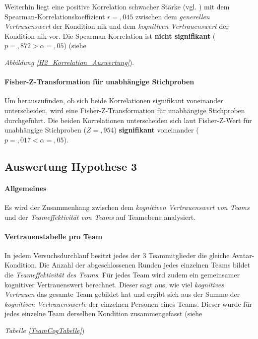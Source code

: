 \documentclass[a4paper,11pt]{article}%
\renewcommand{\\}{\vspace*{0.5\baselineskip} \newline}
\begin{document}
{{{{{{Weiterhin liegt eine positive Korrelation schwacher Stärke (vgl. \citep{cohen2013statistical}) mit dem Spearman-Korrelationskoeffizient $r = ,045$ zwischen dem \textit{generellen Vertrauenswert} der Kondition \newline \ac{nik} und dem \textit{kognitiven Vertrauenswert} der Kondition \ac{nik} vor. Die Spearman-Korrelation ist \textbf{nicht signifikant} ($p = ,872 > \alpha = ,05$) (siehe {\textit{Abbildung \ref{H2_Korrelation_Auswertung}}).

\paragraph{Fisher-Z-Transformation für unabhängige Stichproben}
Um herauszufinden, ob sich beide Korrelationen signifikant voneinander unterscheiden, wird eine Fisher-Z-Transformation für unabhängige Stichproben durchgeführt.
Die beiden Korrelationen unterscheiden sich laut Fisher-Z-Wert für unabhängige Stichproben ($Z =,954$) \textbf{signifikant} voneinander ($p =,017 < \alpha =,05$).

\newpage
\clearpage
\subsection{Auswertung Hypothese 3}
\label{Auswertung Hypothese 3}
\paragraph{Allgemeines}
Es wird der Zusammenhang zwischen dem \textit{kognitiven Vertrauenswert von Teams} und der \textit{Teameffektivität von Teams} auf Teamebene analysiert.

\paragraph{Vertrauenstabelle pro Team}
In jedem Versuchsdurchlauf besitzt jedes der 3 Teammitglieder die gleiche Avatar-Kondition. Die Anzahl der abgeschlossenen Runden jedes einzelnen Teams bildet die \textit{Teameffektivität des Teams}. 
Für jedes Team wird zudem ein gemeinsamer kognitiver Vertrauenswert berechnet. Dieser sagt aus, wie viel \textit{kognitives Vertrauen} das gesamte Team gebildet hat und ergibt sich aus der Summe der \textit{kognitiven Vertrauenswerte} der einzelnen Personen eines Teams. Dieser wurde für jedes einzelne Team derselben Kondition zusammengefasst (siehe {\textit{Tabelle \ref{TeamCogTabelle}})

}}}}}}}}
\end{document}
